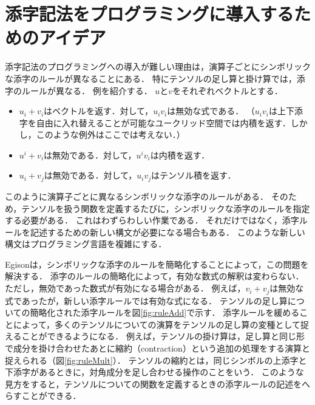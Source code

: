 \section{添字記法をプログラミングに導入するためのアイデア}\label{tensor-idea}

添字記法のプログラミングへの導入が難しい理由は，演算子ごとにシンボリックな添字のルールが異なることにある．
特にテンソルの足し算と掛け算では，添字のルールが異なる．
例を紹介する．
$u$と$v$をそれぞれベクトルとする．
\begin{itemize}
\item $u_{i} + v_{i}$はベクトルを返す．対して，$u_{i} v_{i}$は無効な式である．
（$u_{i} v_{i}$は上下添字を自由に入れ替えることが可能なユークリッド空間では内積を返す．しかし，このような例外はここでは考えない．）
\item $u^{i} + v_{i}$は無効である．対して，$u^{i} v_{i}$は内積を返す．
\item $u_{i} + v_{j}$は無効である．対して，$u_{i} v_{j}$はテンソル積を返す．
\end{itemize}
このように演算子ごとに異なるシンボリックな添字のルールがある．
そのため，テンソルを扱う関数を定義するたびに，シンボリックな添字のルールを指定する必要がある．
これはわずらわしい作業である．
それだけではなく，添字ルールを記述するための新しい構文が必要になる場合もある．
このような新しい構文はプログラミング言語を複雑にする．

Egisonは，シンボリックな添字のルールを簡略化することによって，この問題を解決する．
添字のルールの簡略化によって，有効な数式の解釈は変わらない．
ただし，無効であった数式が有効になる場合がある．
例えば，$v_{i} + v_{j}$は無効な式であったが，新しい添字ルールでは有効な式になる．
テンソルの足し算についての簡略化された添字ルールを図\ref{fig:ruleAdd}で示す．
添字ルールを緩めることによって，多くのテンソルについての演算をテンソルの足し算の変種として捉えることができるようになる．
例えば，テンソルの掛け算は，足し算と同じ形で成分を掛け合わせたあとに縮約（contraction）という追加の処理をする演算と捉えられる（図\ref{fig:ruleMult}）．
テンソルの縮約とは，同じシンボルの上添字と下添字があるときに，対角成分を足し合わせる操作のことをいう．
このような見方をすると，テンソルについての関数を定義するときの添字ルールの記述をへらすことができる．

